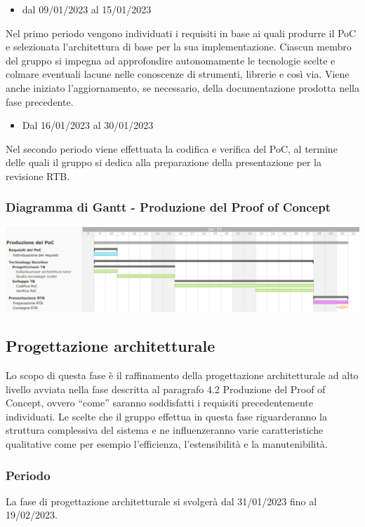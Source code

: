\begin{itemize}
    \item dal 09/01/2023 al 15/01/2023
\end{itemize}
Nel primo periodo vengono individuati i requisiti in base ai quali produrre il PoC e selezionata l’architettura di base per la sua implementazione. Ciascun membro del gruppo si impegna ad approfondire autonomamente le tecnologie scelte e colmare eventuali lacune nelle conoscenze di strumenti, librerie e così via. Viene anche iniziato l'aggiornamento, se necessario, della documentazione prodotta nella fase precedente.

\begin{itemize}
    \item Dal 16/01/2023 al 30/01/2023
\end{itemize}
Nel secondo periodo viene effettuata la codifica e verifica del PoC, al termine delle quali il gruppo si dedica alla preparazione della presentazione per la revisione RTB.

\subsubsection{Diagramma di Gantt - Produzione del Proof of Concept}
\includegraphics[width=\textwidth]{img/4_produzione.png}\\

\subsection{Progettazione architetturale}
Lo scopo di questa fase è il raffinamento della progettazione architetturale ad alto livello avviata nella fase descritta al paragrafo 4.2 Produzione del Proof of Concept, ovvero “come” saranno soddisfatti i requisiti precedentemente individuati.
Le scelte che il gruppo effettua in questa fase riguarderanno la struttura complessiva del sistema e ne influenzeranno varie caratteristiche qualitative come per esempio l’efficienza, l’estensibilità e la manutenibilità.

\subsubsection{Periodo}
La fase di progettazione architetturale si svolgerà dal 31/01/2023 fino al 19/02/2023.

